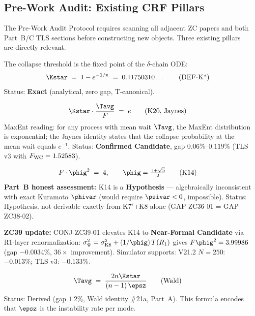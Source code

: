 \documentclass[12pt, a4paper]{article}
\begin{document}
\subsection{Pre-Work Audit: Existing CRF Pillars}
\label{sec:pwa}

The Pre-Work Audit Protocol requires scanning all adjacent ZC papers
and both Part~B/C TLS sections before constructing new objects.
Three existing pillars are directly relevant.

\begin{formalbox}[title={Pillar 1: $\Kstar$ --- Exact Threshold (Part~A)}]
The collapse threshold is the fixed point of the $\delta$-chain ODE:
\[
  \Kstar \;=\; 1 - e^{-1/n} \;=\; 0.11750310\ldots
  \tag{DEF-K*}
\]
Status: \textbf{Exact} (analytical, zero gap, T-canonical).
\end{formalbox}

\begin{formalbox}[title={Pillar 2: Jaynes Identity --- K20 Candidate (Part~B)}]
\[
  \Kstar \cdot \frac{\Tavg}{F} \;=\; e
  \tag{K20, Jaynes}
\]
MaxEnt reading: for any process with mean wait $\Tavg$,
the MaxEnt distribution is exponential; the Jaynes identity
states that the collapse probability at the mean wait equals $e^{-1}$.
Status: \textbf{Confirmed Candidate}, gap $0.06\%$--$0.119\%$
(TLS v3 with $F_{\rm WC} = 1.52583$).
\end{formalbox}

\begin{formalbox}[title={Pillar 3: K14 --- Golden Ratio WaveChain (Part~B + ZC39)}]
\[
  F \cdot \phig^2 \;=\; 4, \qquad \phig = \tfrac{1+\sqrt{5}}{2}
  \tag{K14}
\]
\textbf{Part~B honest assessment:} K14 is a \textbf{Hypothesis} ---
algebraically inconsistent with exact Kuramoto $\phivar$
(would require $\psivar < 0$, impossible). Status: Hypothesis, not derivable
exactly from K7$'$+K8 alone (GAP-ZC36-01 = GAP-ZC38-02).

\textbf{ZC39 update:} CONJ-ZC39-01 elevates K14 to \textbf{Near-Formal Candidate}
via R1-layer renormalization: $\sigma^2_\Psi = \sigma^2_{\rm K8} + (1/\phig)\,T(R_1)$
gives $F\phig^2 = 3.99986$ (gap $-0.0034\%$, $36\times$ improvement).
Simulator supports: V21.2 $N=250$: $-0.013\%$; TLS v3: $-0.133\%$.
\end{formalbox}

\begin{formalbox}[title={Pillar 4: Wald Formula for $\Tavg$ --- Part~A, \#21a}]
\[
  \Tavg \;=\; \frac{2n\Kstar}{(n-1)\,\epsz}
  \tag{Wald}
\]
Status: Derived (gap $1.2\%$, Wald identity \#21a, Part~A).
This formula encodes that $\epsz$ is the instability rate per mode.
\end{formalbox}
\end{document}

